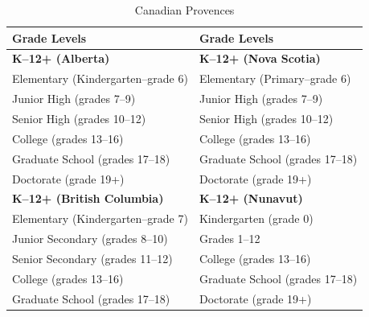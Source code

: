 \documentclass[
]{book}
\theoremstyle{definition}
\theoremstyle{definition}
\theoremstyle{definition}
\theoremstyle{definition}
\theoremstyle{remark}
\begin{document}
\newpage

\begin{table}

\caption{\label{tab:unnamed-chunk-52}Canadian Provences}
\centering
\begin{tabular}[t]{>{}l|l}
\toprule
Grade Levels & Grade Levels \\
\midrule
\textbf{K–12+ (Alberta)} & \textbf{K–12+ (Nova Scotia)}\\
\hspace{1em}Elementary (Kindergarten–grade 6) & \hspace{1em}Elementary (Primary–grade 6)\\
\hspace{1em}Junior High (grades 7–9) & \hspace{1em}Junior High (grades 7–9)\\
\hspace{1em}Senior High (grades 10–12) & \hspace{1em}Senior High (grades 10–12)\\
\hspace{1em}College (grades 13–16) & \hspace{1em}College (grades 13–16)\\
\hspace{1em}Graduate School (grades 17–18) & \hspace{1em}Graduate School (grades 17–18)\\
\hspace{1em}Doctorate (grade 19+) & \hspace{1em}Doctorate (grade 19+)\\
\textbf{K–12+ (British Columbia)} & \textbf{K–12+ (Nunavut)}\\
\hspace{1em}Elementary (Kindergarten–grade 7) & \hspace{1em}Kindergarten (grade 0)\\
\hspace{1em}Junior Secondary (grades 8–10) & \hspace{1em}Grades 1–12\\
\hspace{1em}Senior Secondary (grades 11–12) & \hspace{1em}College (grades 13–16)\\
\hspace{1em}College (grades 13–16) & \hspace{1em}Graduate School (grades \vphantom{1} 17–18)\\
\hspace{1em}Graduate School (grades 17–18) & \hspace{1em}Doctorate (grade \vphantom{1} 19+)\\

\end{tabular}
\end{table}
\end{document}
